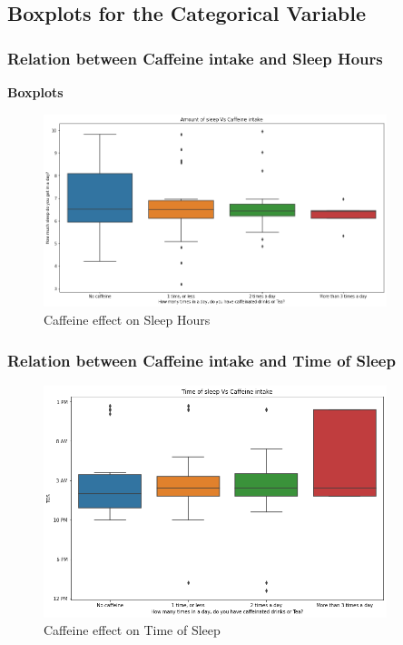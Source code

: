 \documentclass[11pt,]{beamer}
\begin{document}
\subsection{Boxplots for the Categorical Variable}

\begin{frame}

    \frametitle{Relation between Caffeine intake and Sleep Hours}
    
    \textbf{Boxplots}
    
    \begin{figure}
		\includegraphics[width=10cm]{Caffeine_SleepHours.png}
		\caption{Caffeine effect on Sleep Hours}
	\end{figure}

\end{frame}

\begin{frame}

    \frametitle{Relation between Caffeine intake and Time of Sleep}
    
    \begin{figure}
		\includegraphics[width=10cm]{Caffeine_SleepTime.png}
		\caption{Caffeine effect on Time of Sleep}
	\end{figure}

\end{frame}
\end{document}
